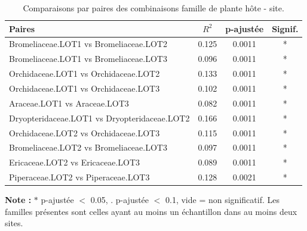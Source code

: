 \documentclass[a4paper,12pt]{article}
\begin{document}
\begin{table}[H]
    \centering
    \caption{Comparaisons par paires des combinaisons famille de plante hôte - site.}
    \label{tab:permanova_pairwise_familles_lots}
    \renewcommand{\arraystretch}{1.1}
    \setlength{\tabcolsep}{3pt}
    \scriptsize
    \begin{tabular}{lccc}
        \hline
        \textbf{Paires} & \textbf{$R^2$} & \textbf{p-ajustée} & \textbf{Signif.} \\
        \hline
        Bromeliaceae.LOT1 vs Bromeliaceae.LOT2 & 0.125 & 0.0011 & * \\
        Bromeliaceae.LOT1 vs Bromeliaceae.LOT3 & 0.096 & 0.0011 & * \\
        Orchidaceae.LOT1 vs Orchidaceae.LOT2 & 0.133 & 0.0011 & * \\
        Orchidaceae.LOT1 vs Orchidaceae.LOT3 & 0.102 & 0.0011 & * \\
        Araceae.LOT1 vs Araceae.LOT3 & 0.082 & 0.0011 & * \\
        Dryopteridaceae.LOT1 vs Dryopteridaceae.LOT2 & 0.166 & 0.0011 & * \\
        Orchidaceae.LOT2 vs Orchidaceae.LOT3 & 0.115 & 0.0011 & * \\
        Bromeliaceae.LOT2 vs Bromeliaceae.LOT3 & 0.097 & 0.0011 & * \\
        Ericaceae.LOT2 vs Ericaceae.LOT3 & 0.089 & 0.0011 & * \\
        Piperaceae.LOT2 vs Piperaceae.LOT3 & 0.128 & 0.0021 & * \\
        \hline
    \end{tabular}
    \begin{flushleft}
    \scriptsize
    \textbf{Note :} $*$ p-ajustée $<$ 0.05, $.$ p-ajustée $<$ 0.1, vide = non significatif. Les familles présentes sont celles ayant au moins un échantillon dans au moins deux sites.
    \end{flushleft}

\end{table}
\end{document}
